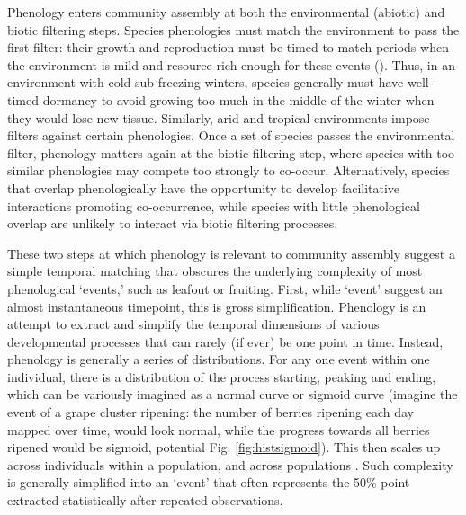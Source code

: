 \documentclass[11pt]{article}
\begin{document}
Phenology enters community assembly at both the environmental (abiotic) and biotic filtering steps. Species phenologies must match the environment to pass the first filter: their growth and reproduction must be timed to match periods when the environment is mild and resource-rich enough for these events (\citet{rathcke1985phenological}). Thus, in an environment with cold sub-freezing winters, species generally must have well-timed dormancy to avoid growing too much in the middle of the winter when they would lose new tissue. Similarly, arid and tropical environments impose filters against certain phenologies. Once a set of species passes the environmental filter, phenology matters again at the biotic filtering step, where species with too similar phenologies may compete too strongly to co-occur.  Alternatively, species that overlap phenologically have the opportunity to develop facilitative interactions \citep{duchenne2021phenological} promoting co-occurrence, while species with little phenological overlap are unlikely to interact via biotic filtering processes.

These two steps at which phenology is relevant to community assembly suggest a simple temporal matching that obscures the underlying complexity of most phenological `events,' such as leafout or fruiting. First, while `event' suggest an almost instantaneous timepoint, this is gross simplification. Phenology is an attempt to extract and simplify the temporal dimensions of various developmental processes that can rarely (if ever) be one point in time. Instead, phenology is generally a series of distributions. For any one event within one individual, there is a distribution of the process starting, peaking and ending, which can be variously imagined as a normal curve or sigmoid curve (imagine the event of a grape cluster ripening: the number of berries ripening each day mapped over time, would look normal, while the progress towards all berries ripened would be sigmoid, potential Fig.  \ref{fig:histsigmoid}). This then scales up across individuals within a population, and across populations \citep{inouye2019}. Such complexity is generally simplified into an `event' that often represents the 50\% point extracted statistically after repeated observations. 
\end{document}
